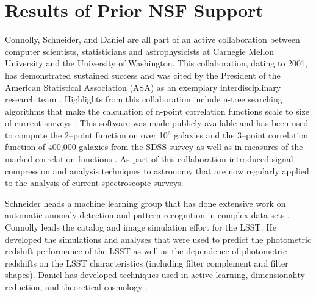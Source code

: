 \documentclass[prd, nofootinbib, floatfix, 12pt,tightenlines]{revtex4}
\begin{document}
\section{Results of Prior NSF Support}

Connolly, Schneider, and Daniel are all part of an active
collaboration between computer scientists, statisticians and
astrophysicists at Carnegie Mellon University and the University of
Washington.  This collaboration, dating to 2001, has demonstrated
sustained success and was cited by the President of the American
Statistical Association (ASA) as an exemplary interdisciplinary
research team \cite{straf03}. Highlights from this collaboration
include n-tree searching algorithms that make the calculation of
n-point correlation functions scale to size of current surveys
\cite{Moore00}. This software was made publicly available and has been
used to compute the 2--point function on over 10$^6$ galaxies and the
3--point correlation function of 400,000 galaxies from the SDSS survey
\cite{Scranton2002,Szapudi2002,Nichol2006,mcbride2011a,mcbride2011b}
as well as in measures of the marked correlation functions
\cite{Skibba2006}.  As part of this collaboration \cite{yip2004a,
  vdp2009, daniel2011} introduced signal compression and analysis
techniques to astronomy that are now regularly applied to the analysis
of current spectroscopic surveys.

Schneider heads a machine learning group that has done extensive work
on automatic anomaly detection and pattern-recognition in complex data
sets \cite{Xiong2011gad,poczos12CVPR}.  Connolly leads the catalog and
image simulation effort for the LSST. He developed the simulations and
analyses that were used to predict the photometric redshift
performance of the LSST as well as the dependence of photometric
redshifts on the LSST characteristics (including filter complement and
filter shapes). Daniel has developed techniques used in active
learning, dimensionality reduction, and theoretical cosmology
\citep{daniel2011, daniel2012}.
\end{document}
